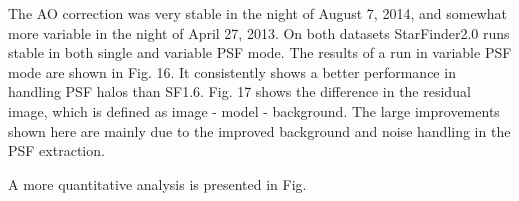 The AO correction was very stable in the night of August 7, 2014, and somewhat more variable in the night of April 27, 2013. On both datasets StarFinder2.0 runs stable in both single and variable PSF mode. The results of a run in variable PSF mode are shown in Fig. 16. It consistently shows a better performance in handling PSF halos than SF1.6. Fig. 17 shows the difference in the residual image, which is defined as image - model - background. The large improvements shown here are mainly due to the improved background and noise handling in the PSF extraction.

A more quantitative analysis is presented in Fig.  
  
  